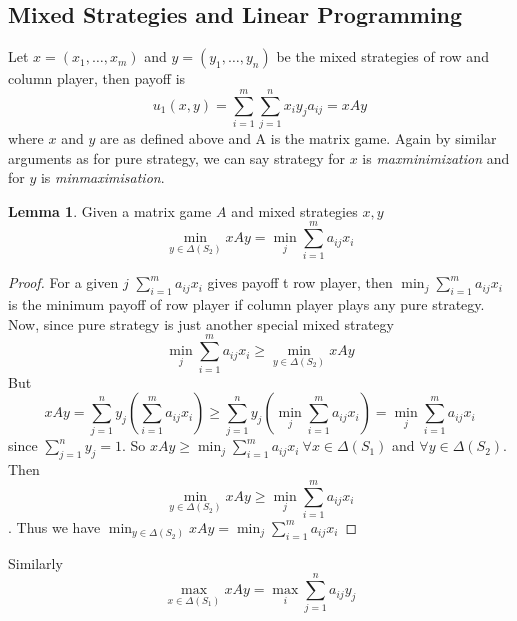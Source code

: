 \documentclass{article}
\theoremstyle{definition}
\newtheorem{lem}{Lemma}[section]
\begin{document}
\subsection{Mixed Strategies and Linear Programming}
Let $x = (x_1,\dots,x_m)$ and $y= (y_1,\dots,y_n)$ be the mixed strategies of row and column player, then payoff is $$u_1(x,y) = \sum_{i=1}^m\sum_{j=1}^n x_iy_ja_{ij} = xAy$$ where $x$ and $y$ are as defined above and A is the matrix game. Again by similar arguments as for pure strategy, we can say strategy for $x$ is \textit{maxminimization} and for $y$ is \textit{minmaximisation}. 
\begin{lem}
\label{min}
Given a matrix game $A$ and mixed strategies $x,y$ $$\min_{y\in \Delta(S_2)} xAy = \min_j \sum_{i=1}^m a_{ij}x_i$$
\end{lem}
\begin{proof}
For a given $j$ $\sum_{i=1}^m a_{ij}x_i$ gives payoff t row player, then $\min_j \sum_{i=1}^m a_{ij}x_i$ is the minimum payoff of row player if column player plays any pure strategy. Now, since pure strategy is just another special mixed strategy $$\min_j \sum_{i=1}^m a_{ij}x_i \geq \min_{y\in \Delta(S_2)} xAy$$ But $$xAy = \sum_{j=1}^n y_j\left(\sum_{i=1}^m a_{ij}x_i\right) \geq \sum_{j=1}^n y_j\left(\min_j \sum_{i=1}^m a_{ij}x_i\right) = \min_j \sum_{i=1}^m a_{ij}x_i$$ since $\sum_{j=1}^n y_j = 1$. So $xAy \geq \min_j \sum_{i=1}^m a_{ij}x_i~\forall x\in \Delta(S_1)$ and $\forall y\in \Delta(S_2)$. Then $$\min_{y\in \Delta(S_2)} xAy \geq \min_j \sum_{i=1}^m a_{ij}x_i$$. Thus we have $\min_{y\in \Delta(S_2)} xAy = \min_j \sum_{i=1}^m a_{ij}x_i$
\end{proof}
Similarly $$\max_{x\in \Delta(S_1)} xAy = \max_i \sum_{j=1}^n a_{ij}y_j$$
\end{document}
